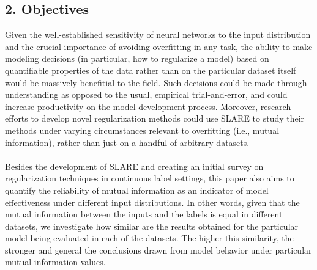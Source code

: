 \documentclass{NSF}
\begin{document}
\subsection{2. Objectives}

Given the well-established sensitivity of neural networks to the input distribution and
the crucial importance of avoiding overfitting in any task, the ability to make modeling
decisions (in particular, how to regularize a model) based on quantifiable properties of
the data rather than on the particular dataset itself would be massively benefitial to
the field. Such decisions could be made through understanding as opposed to the usual,
empirical trial-and-error, and could increase productivity on the model development
process. Moreover, research efforts to develop novel regularization methods could use
SLARE to study their methods under varying circumstances relevant to overfitting (i.e.,
mutual information), rather than just on a handful of arbitrary datasets.
\\
\\
Besides the development of SLARE and creating an initial survey on regularization
techniques in continuous label settings, this paper also aims to quantify the reliability
of mutual information as an indicator of model effectiveness under different input
distributions. In other words, given that the mutual information between the inputs and
the labels is equal in different datasets, we investigate how similar are the results
obtained for the particular model being evaluated in each of the datasets. The higher
this similarity, the stronger and general the conclusions drawn from model behavior under
particular mutual information values.
\end{document}
